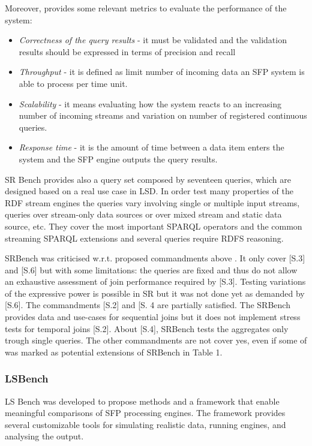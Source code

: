 Moreover, \cite{Zhang2012} provides some relevant metrics to evaluate the performance of the system: 
\begin{itemize}
\item \textit{Correctness of the query results} - it must be validated and the validation results should be expressed in terms of precision and recall
\item \textit{Throughput} - it is defined as limit number of incoming data an SFP system is able to process per time unit.
\item \textit{Scalability} - it means evaluating how the system reacts to an increasing number of incoming streams and variation on number of registered continuous queries.
\item \textit{Response time} - it is the amount of time between a data item enters the system and the SFP engine outputs the query results.
\end{itemize}

SR Bench provides also a query set composed by seventeen queries, which are designed based on a real use case in LSD. In order test many properties of the RDF stream engines the queries vary involving single or multiple input streams, queries over stream-only data sources or over mixed stream and static data source, etc. They cover the most important SPARQL operators and the common streaming SPARQL extensions and several queries require RDFS reasoning.

SRBench was criticised w.r.t. proposed commandments above \cite{DBLP:conf/esws/ScharrenbachUMVB13}. It only cover [S.3] and [S.6] but with some limitations: the queries are fixed and thus do not allow an exhaustive assessment of join performance required by [S.3]. Testing variations of the expressive power is possible in SR but it was not done yet as demanded by [S.6]. The commandments [S.2] and [S.
4 are partially satisfied. The SRBench provides data and use-cases for sequential joins but it does not implement stress tests for temporal joins [S.2]. About [S.4], SRBench tests the aggregates only trough single queries. The other commandments are not cover yes, even if some of was marked as potential extensions of SRBench in \cite{DBLP:conf/esws/ScharrenbachUMVB13} Table 1.

\subsubsection{LSBench}\label{sec:lsbench}

LS Bench was developed to propose methods and a framework that enable meaningful comparisons of SFP processing engines. The framework provides several customizable tools for simulating realistic data, running engines, and analysing the output. 


